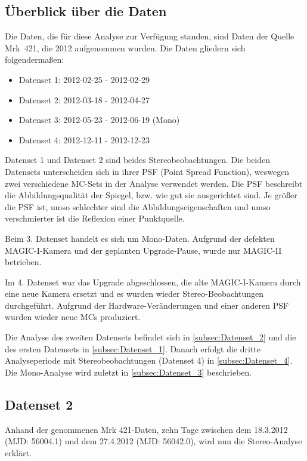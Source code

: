 \subsection{Überblick über die Daten}
Die Daten, die für diese Analyse zur Verfügung standen, sind Daten der Quelle Mrk~421, die 2012 aufgenommen wurden.
Die Daten gliedern sich folgendermaßen:

\begin{itemize}
 \item Datenset 1: 2012-02-25 - 2012-02-29
 \item Datenset 2: 2012-03-18 - 2012-04-27
 \item Datenset 3: 2012-05-23 - 2012-06-19 (Mono)
 \item Datenset 4: 2012-12-11 - 2012-12-23
\end{itemize}

Datenset 1 und Datenset 2 sind beides Stereobeobachtungen.
Die beiden Datensets unterscheiden sich in ihrer PSF (Point Spread Function), weswegen zwei verschiedene MC-Sets in der Analyse verwendet werden.
Die PSF beschreibt die Abbildungsqualität der Spiegel, bzw. wie gut sie ausgerichtet sind.
Je größer die PSF ist, umso schlechter sind die Abbildungseigenschaften und umso verschmierter ist die Reflexion einer Punktquelle.

Beim 3. Datenset handelt es sich um Mono-Daten. 
Aufgrund der defekten MAGIC-I-Kamera und der geplanten Upgrade-Pause, wurde nur MAGIC-II betrieben.

Im 4. Datenset war das Upgrade abgeschlossen, die alte MAGIC-I-Kamera durch eine neue Kamera ersetzt und es wurden wieder Stereo-Beobachtungen durchgeführt.
Aufgrund der Hardware-Veränderungen und einer anderen PSF wurden wieder neue MCs produziert.

Die Analyse des zweiten Datensets befindet sich in \autoref{subsec:Datenset_2} und die des ersten Datensets in \autoref{subsec:Datenset_1}.
Danach erfolgt die dritte Analyseperiode mit Stereobeobachtungen (Datenset 4) in \autoref{subsec:Datenset_4}.
Die Mono-Analyse wird zuletzt in \autoref{subsec:Datenset_3} beschrieben.


\subsection{Datenset 2}
\label{subsec:Datenset_2}
Anhand der genommenen Mrk 421-Daten, zehn Tage zwischen dem 18.3.2012 (MJD: 56004.1) und dem 27.4.2012 (MJD: 56042.0), wird nun die Stereo-Analyse erklärt.

